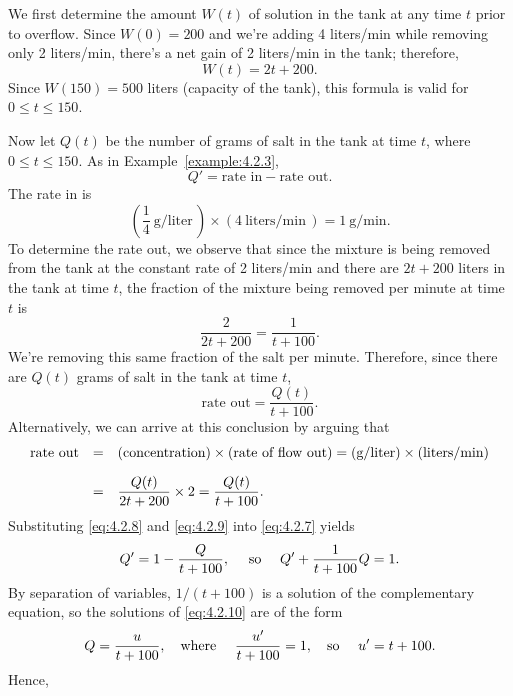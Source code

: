 \begin{examplesolution}
\solution We first determine the amount $W(t)$ of solution in the tank at any time $t$ prior to
overflow. Since $W(0)=200$ and we're adding 4 liters/min while removing only 2 liters/min, there's a
net gain of 2 liters/min in the tank; therefore,
\[
  W(t)=2t+200.
\]
Since $W(150)=500$ liters (capacity of the tank), this formula is valid for $0\le t\le150$.

Now let $Q(t)$ be the number of grams of salt in the tank at time $t$, where $0\le t\le150$. As in
Example~\ref{example:4.2.3},
\begin{equation}
  \label{eq:4.2.7}Q'=\mbox{rate in}-\mbox{rate out}.
\end{equation}
The rate in is
\begin{equation}
  \label{eq:4.2.8}\left(\frac{1}{4}\ \mbox{g/liter}\,\right)\times(4\
\mbox{liters/min}\,)=1\ \mbox{g/min}.
\end{equation}
To determine the rate out, we observe that since the mixture is being removed from the tank at the
constant rate of 2 liters/min and there are $2t+200$ liters in the tank at time $t$, the fraction of
the mixture being removed per minute at time $t$ is
\[
  \frac{2}{2t+200}=\frac{1}{t+100}.
\]
We're removing this same fraction of the salt per minute. Therefore, since there are $Q(t)$ grams of
salt in the tank at time $t$,
\begin{equation}
  \label{eq:4.2.9}\mbox{rate out}=\frac{Q(t)}{t+100}.
\end{equation}
Alternatively, we can arrive at this conclusion by arguing that
\[
  \begin{array}{lcl}
    \mbox{rate out} & = & (\mbox{concentration})\times(\mbox{rate of flow out}) =(\mbox{g/liter})\times(\mbox{liters/min}) \\[10pt]
                    & = & \displaystyle\frac{Q(t)}{2t+200}\times 2=\displaystyle\frac{Q(t)}{t+100}.
  \end{array}
\]
Substituting \eqref{eq:4.2.8} and \eqref{eq:4.2.9} into \eqref{eq:4.2.7} yields
\begin{equation}
  \label{eq:4.2.10}Q'=1-\frac{Q}{t+100},\quad\text{ \rm so }\quad Q'+\frac{1}{t+100}Q=1.
\end{equation}
By separation of variables, $1/(t+100)$ is a solution of the complementary equation, so the
solutions of \eqref{eq:4.2.10} are of the form
\[
  Q=\frac{u}{t+100},\mbox{\quad where \quad}{\frac{u'}{t+100}}=1,\mbox{\quad so \quad}u'=t+100.
\]
Hence,
\begin{equation}

\end{equation}
\end{examplesolution}
